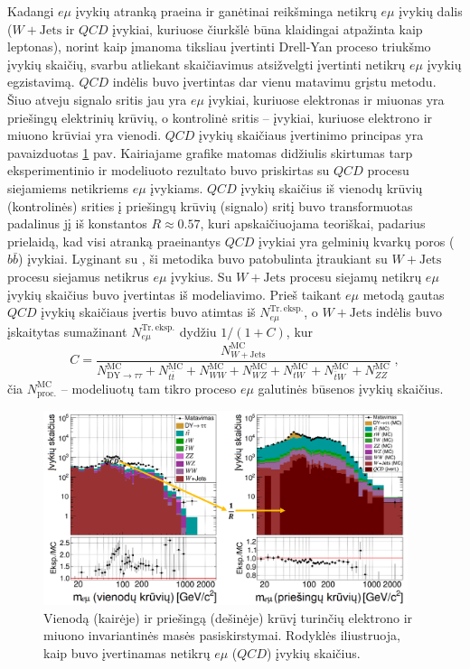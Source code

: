 \documentclass[a4paper, 12pt, oneside]{article}
\newcommand{\emu}{e\mu}
\newcommand{\WJets}{W\! +\!\mathrm{Jets}}
\newcommand{\QCD}{QC\! D}
\newlength\q
\begin{document}
Kadangi $\emu$ įvykių atranką praeina ir ganėtinai reikšminga netikrų $\emu$ įvykių dalis
($\WJets$ ir $\QCD$ įvykiai, kuriuose čiurkšlė būna klaidingai atpažinta kaip leptonas),
norint kaip įmanoma tiksliau įvertinti Drell-Yan proceso triukšmo įvykių skaičių, svarbu atliekant skaičiavimus atsižvelgti
įvertinti netikrų $\emu$ įvykių egzistavimą.
$\QCD$ indėlis buvo įvertintas dar vienu matavimu grįstu metodu.
Šiuo atveju signalo sritis jau yra $\emu$ įvykiai, kuriuose elektronas ir miuonas yra priešingų elektrinių
krūvių, o kontrolinė sritis -- įvykiai, kuriuose elektrono ir miuono krūviai yra vienodi.
$\QCD$ įvykių skaičiaus įvertinimo principas yra pavaizduotas \ref{fig:emuQCD} pav.
Kairiajame grafike matomas didžiulis skirtumas tarp eksperimentinio ir modeliuoto rezultato buvo
priskirtas su $\QCD$ procesu siejamiems netikriems $\emu$ įvykiams.
$\QCD$ įvykių skaičius iš vienodų krūvių (kontrolinės) srities į priešingų krūvių (signalo) sritį
buvo transformuotas padalinus jį iš konstantos $R\approx 0.57$, kuri apskaičiuojama teoriškai,
padarius prielaidą, kad visi atranką praeinantys $\QCD$ įvykiai yra gelminių kvarkų poros
($b\bar{b}$) įvykiai.
Lyginant su \cite{MAk1}, ši metodika buvo patobulinta įtraukiant su $\WJets$ procesu siejamus netikrus $\emu$ įvykius.
Su $\WJets$ procesu siejamų netikrų $e\mu$ įvykių skaičius buvo įvertintas iš modeliavimo.
Prieš taikant $\emu$ metodą gautas $\QCD$ įvykių skaičiaus įvertis buvo atimtas iš
$N_{e\mu}^{\mathrm{Tr. \, eksp.}}$, o $W+\mathrm{Jets}$ indėlis buvo įskaitytas sumažinant
$N_{e\mu}^{\mathrm{Tr. \, eksp.}}$ dydžiu $1/(1+C)$, kur
\begin{equation*}
	C = \frac{ N_{W+\mathrm{Jets}}^{\mathrm{MC}} } { N_{\mathrm{DY}\rightarrow\tau\tau}^{\mathrm{MC}} + 
	N_{t\bar{t}}^{\mathrm{MC}} + N_{WW}^{\mathrm{MC}} + N_{WZ}^{\mathrm{MC}} + N_{tW}^{\mathrm{MC}} + N_{\bar{t}W}^{\mathrm{MC}} +
	N_{ZZ}^{\mathrm{MC}} } \; ,
\end{equation*}
čia $N^{\mathrm{MC}}_{\mathrm{proc.}}$ -- modeliuotų tam tikro proceso $\emu$ galutinės būsenos įvykių skaičius.

\begin{figure}[H]
	\includegraphics[width=0.95\textwidth]{emuQCDest.png}
	\vspace{-0.2cm}
	\caption{\label{fig:emuQCD} Vienodą (kairėje) ir priešingą (dešinėje) krūvį turinčių elektrono ir
	miuono invariantinės masės pasiskirstymai.
	Rodyklės iliustruoja, kaip buvo įvertinamas netikrų $\emu$ ($\QCD$) įvykių skaičius.
	}
\end{figure}
\end{document}
